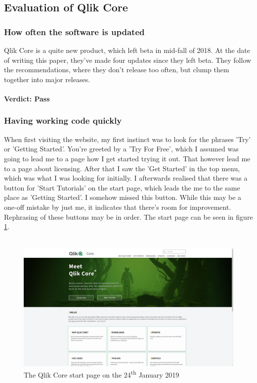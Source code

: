 \documentclass{article}
\begin{document}
\subsection{Evaluation of Qlik Core}
\subsubsection{How often the software is updated}
Qlik Core is a quite new product, which left beta in mid-fall of 2018. At the date of writing this paper, they've made four updates since they left beta. They follow the recommendations, where they don't release too often, but clump them together into major releases.\\ \\
\textbf{Verdict: Pass}
\subsubsection{Having working code quickly}
When first visiting the website, my first instinct was to look for the phrases 'Try' or 'Getting Started'. You're greeted by a 'Try For Free', which I assumed was going to lead me to a page how I get started trying it out. That however lead me to a page about licensing. After that I saw the 'Get Started' in the top menu, which was what I was looking for initially. I afterwards realised that there was a button for 'Start Tutorials' on the start page, which leads the me to the same place as 'Getting Started'. I somehow missed this button. While this may be a one-off mistake by just me, it indicates that there's room for improvement. Rephrasing of these buttons may be in order. The start page can be seen in figure \ref{fig:startpage}. \\ \\
\begin{figure}[H]
    \centering
    \includegraphics[width=\linewidth]{qlikCoreWebsite20190124.png}
    \caption{The Qlik Core start page on the 24\textsuperscript{th} January 2019}
    \label{fig:startpage}
\end{figure}
\end{document}
